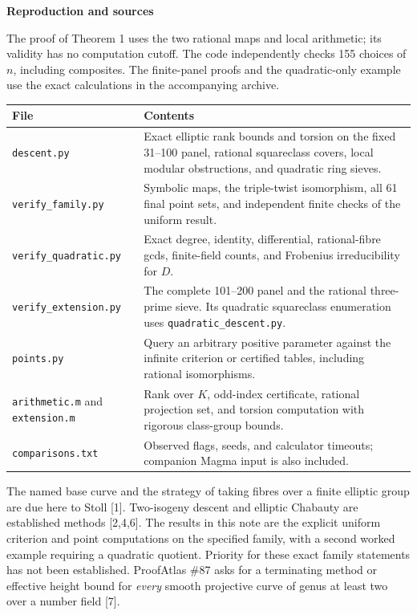 \documentclass[12pt]{article}
\newcommand{\heading}[1]{{\Large\bfseries\color{ink}#1}\par\vspace{3pt}}
\begin{document}
\newpage
\heading{Reproduction and sources}
The proof of Theorem 1 uses the two rational maps and local arithmetic; its validity has no computation cutoff. The code independently checks 155 choices of $n$, including composites. The finite-panel proofs and the quadratic-only example use the exact calculations in the accompanying archive.

\smallskip
\begin{tabular}{@{}p{.29\linewidth}p{.65\linewidth}@{}}
\toprule
\textbf{File} & \textbf{Contents}\\ \midrule
\texttt{descent.py} & Exact elliptic rank bounds and torsion on the fixed 31--100 panel, rational squareclass covers, local modular obstructions, and quadratic ring sieves.\\
\texttt{verify\_family.py} & Symbolic maps, the triple-twist isomorphism, all 61 final point sets, and independent finite checks of the uniform result.\\
\texttt{verify\_quadratic.py} & Exact degree, identity, differential, rational-fibre gcds, finite-field counts, and Frobenius irreducibility for $D$.\\
\texttt{verify\_extension.py} & The complete 101--200 panel and the rational three-prime sieve. Its quadratic squareclass enumeration uses \texttt{quadratic\_descent.py}.\\
\texttt{points.py} & Query an arbitrary positive parameter against the infinite criterion or certified tables, including rational isomorphisms.\\
\texttt{arithmetic.m} and \texttt{extension.m} & Rank over $K$, odd-index certificate, rational projection set, and torsion computation with rigorous class-group bounds.\\
\texttt{comparisons.txt} & Observed flags, seeds, and calculator timeouts; companion Magma input is also included.\\
\bottomrule
\end{tabular}

The named base curve and the strategy of taking fibres over a finite elliptic group are due here to Stoll [1]. Two-isogeny descent and elliptic Chabauty are established methods [2,4,6]. The results in this note are the explicit uniform criterion and point computations on the specified family, with a second worked example requiring a quadratic quotient. Priority for these exact family statements has not been established. ProofAtlas \#87 asks for a terminating method or effective height bound for \emph{every} smooth projective curve of genus at least two over a number field [7].
\end{document}
